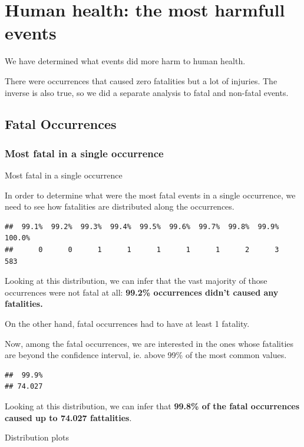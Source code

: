 \section{Human health: the most harmfull
events}\label{human-health-the-most-harmfull-events}

We have determined what events did more harm to human health.

There were occurrences that caused zero fatalities but a lot of
injuries. The inverse is also true, so we did a separate analysis to
fatal and non-fatal events.

\subsection{Fatal Occurrences}\label{fatal-occurrences}

\subsubsection{Most fatal in a single
occurrence}\label{most-fatal-in-a-single-occurrence}

Most fatal in a single occurrence

In order to determine what were the most fatal events in a single
occurrence, we need to see how fatalities are distributed along the
occurrences.

\begin{verbatim}
##  99.1%  99.2%  99.3%  99.4%  99.5%  99.6%  99.7%  99.8%  99.9% 100.0% 
##      0      0      1      1      1      1      1      2      3    583
\end{verbatim}

Looking at this distribution, we can infer that the vast majority of
those occurrences were not fatal at all: \textbf{99.2\% occurrences
didn't caused any fatalities.}

On the other hand, fatal occurrences had to have at least 1 fatality.

Now, among the fatal occurrences, we are interested in the ones whose
fatalities are beyond the confidence interval, ie. above 99\% of the
most common values.

\begin{verbatim}
##  99.9% 
## 74.027
\end{verbatim}

Looking at this distribution, we can infer that \textbf{99.8\% of the
fatal occurrences caused up to 74.027 fattalities}.

Distribution plots

